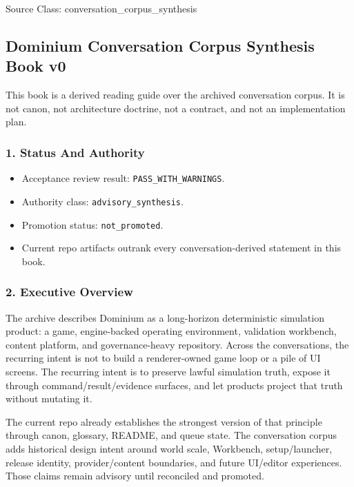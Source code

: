 \documentclass[9pt,a4paper,openany]{book}
\begin{document}
Source Class: conversation\_\allowbreak{}corpus\_\allowbreak{}synthesis



\subsection{Dominium Conversation Corpus Synthesis Book v0}

This book is a derived reading guide over the archived conversation corpus.\allowbreak{} It is not canon, not architecture doctrine, not a contract, and not an implementation plan.\allowbreak{}


\subsubsection{1. Status And Authority}

\begin{itemize}
\item Acceptance review result: \texttt{PASS\_\allowbreak{}WITH\_\allowbreak{}WARNINGS}.\allowbreak{}
\item Authority class: \texttt{advisory\_\allowbreak{}synthesis}.\allowbreak{}
\item Promotion status: \texttt{not\_\allowbreak{}promoted}.\allowbreak{}
\item Current repo artifacts outrank every conversation-\allowbreak{}derived statement in this book.\allowbreak{}
\end{itemize}

\subsubsection{2. Executive Overview}

The archive describes Dominium as a long-\allowbreak{}horizon deterministic simulation product: a game, engine-\allowbreak{}backed operating environment, validation workbench, content platform, and governance-\allowbreak{}heavy repository.\allowbreak{} Across the conversations, the recurring intent is not to build a renderer-\allowbreak{}owned game loop or a pile of UI screens.\allowbreak{} The recurring intent is to preserve lawful simulation truth, expose it through command/\allowbreak{}result/\allowbreak{}evidence surfaces, and let products project that truth without mutating it.\allowbreak{}


The current repo already establishes the strongest version of that principle through canon, glossary, README, and queue state.\allowbreak{} The conversation corpus adds historical design intent around world scale, Workbench, setup/\allowbreak{}launcher, release identity, provider/\allowbreak{}content boundaries, and future UI/\allowbreak{}editor experiences.\allowbreak{} Those claims remain advisory until reconciled and promoted.\allowbreak{}
\end{document}

